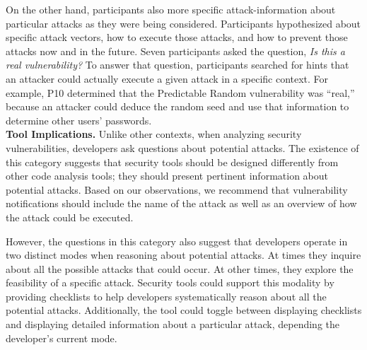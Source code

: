 \documentclass[conference]{IEEEtran}
\begin{document}
On the other hand, participants also more specific attack-information about particular attacks as they were being considered.
Participants hypothesized about specific attack vectors, how to execute those attacks, and how to prevent those attacks now and in the future.
Seven participants asked the question, \textit{Is this a real vulnerability?} To answer that question, participants searched for hints that an attacker could actually execute a given attack in a specific context. For example, P10 determined that the Predictable Random vulnerability was ``real,'' because an attacker could deduce the random seed and use that information to determine other users' passwords. 
\\

\noindent\textbf{Tool Implications.}
Unlike other contexts, when analyzing security vulnerabilities, developers ask questions about potential attacks.
The existence of this category suggests that security tools should be designed differently from other code analysis tools; they should present pertinent information about potential attacks. 
Based on our observations, we recommend that vulnerability notifications should include the name of the attack as well as an overview of how the attack could be executed.

However, the questions in this category also suggest that developers operate in two distinct modes when reasoning about potential attacks.
At times they inquire about all the possible attacks that could occur.
At other times, they explore the feasibility of a specific attack.
Security tools could support this modality by providing checklists to help developers systematically reason about all the potential attacks. 
Additionally, the tool could toggle between displaying checklists and displaying detailed information about a particular attack, depending the developer's current mode.
\end{document}
